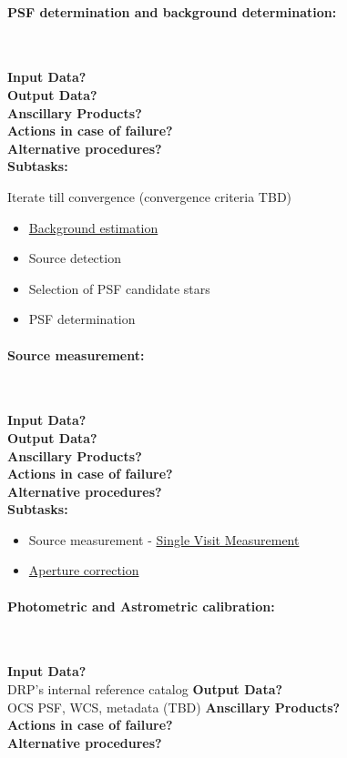 \paragraph{PSF determination and background determination:}~

\noindent
{\bf Input Data?}\\
{\bf Output Data?}\\
{\bf Anscillary Products?}\\
{\bf Actions in case of failure?}\\
{\bf Alternative procedures?}\\

\noindent
{\bf Subtasks:}

Iterate till convergence (convergence criteria TBD)
\begin{itemize}
\item \hyperref[sec:background]{Background estimation}
\item Source detection
\item Selection of PSF candidate stars
\item PSF determination
\end{itemize}

\paragraph{Source measurement:}~

\noindent
{\bf Input Data?}\\
{\bf Output Data?}\\
{\bf Anscillary Products?}\\
{\bf Actions in case of failure?}\\
{\bf Alternative procedures?}\\

\noindent
{\bf Subtasks:}
\begin{itemize}
\item  Source measurement - \hyperref[sec:measurement]{Single Visit Measurement}
\item  \hyperref[sec:apertureCorrection]{Aperture correction}
\end{itemize}

\paragraph{Photometric and Astrometric calibration:}~

\noindent
{\bf Input Data?}\\
DRP's internal reference catalog
{\bf Output Data?}\\
OCS PSF, WCS, metadata (TBD) 
{\bf Anscillary Products?}\\
{\bf Actions in case of failure?}\\
{\bf Alternative procedures?}\\

